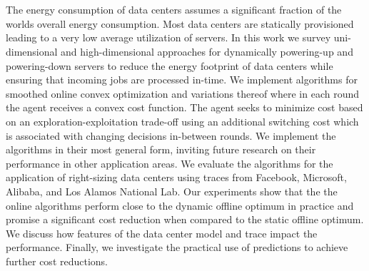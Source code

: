 \chapter{\abstractname}

The energy consumption of data centers assumes a significant fraction of the worlds overall energy consumption. Most data centers are statically provisioned leading to a very low average utilization of servers. In this work we survey uni-dimensional and high-dimensional approaches for dynamically powering-up and powering-down servers to reduce the energy footprint of data centers while ensuring that incoming jobs are processed in-time. We implement algorithms for smoothed online convex optimization and variations thereof where in each round the agent receives a convex cost function. The agent seeks to minimize cost based on an exploration-exploitation trade-off using an additional switching cost which is associated with changing decisions in-between rounds. We implement the algorithms in their most general form, inviting future research on their performance in other application areas. We evaluate the algorithms for the application of right-sizing data centers using traces from Facebook, Microsoft, Alibaba, and Los Alamos National Lab. Our experiments show that the the online algorithms perform close to the dynamic offline optimum in practice and promise a significant cost reduction when compared to the static offline optimum. We discuss how features of the data center model and trace impact the performance. Finally, we investigate the practical use of predictions to achieve further cost reductions.
